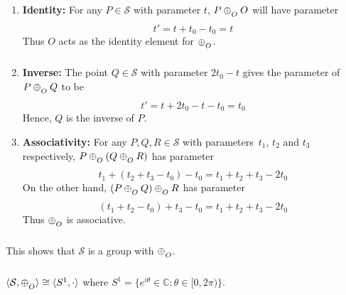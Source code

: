 \begin{enumerate}
    \item{\textbf{Identity:}} For any $P \in \mathcal{S}$ with parameter $t$,
        $P \conop O$ will have parameter
        \[ t' = t + t_0 - t_0 = t \]
        Thus $O$ acts as the identity element for $\conop$.

    \item{\textbf{Inverse:}} The point $Q\in\mathcal{S}$ with parameter
        $2t_0 - t$ gives the parameter of $P \conop Q$ to be
        \[ t' = t + 2t_0 - t - t_0 = t_0 \]
        Hence, $Q$ is the inverse of $P$.

    \item{\textbf{Associativity:}} For any $P,Q,R \in \mathcal{S}$ with parameters\
        $t_1$, $t_2$ and $t_3$ respectively, $P\conop(Q \conop R)$
        has parameter
        \[
            t_1 + (t_2 + t_3 - t_0) - t_0 =
            t_1 + t_2 + t_3 - 2t_0
        \]
        On the other hand, $(P \conop Q)\conop R$ has parameter
        \[
            (t_1 + t_2 - t_0) + t_3 - t_0 =
            t_1 + t_2 + t_3 - 2t_0
        \]
        Thus $\conop$ is associative.
\end{enumerate}

\noindent
This shows that $\mathcal{S}$ is a group with $\conop$.

\begin{theorem}
    $\langle \mathcal{S},\conop \rangle \cong \langle S^1,\cdot \rangle$ where
    $S^1=\{e^{i\theta}\in\mathbb{C}: \theta \in [0,2\pi)\}$.
\end{theorem}

